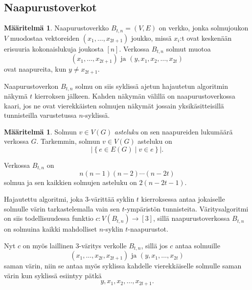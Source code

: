 \documentclass[finnish]{tktltiki2}
\theoremstyle{definition}
\newtheorem{maar}[lau]{Määritelmä}
\theoremstyle{remark}
\newcommand{\set}[1]{\left\{ #1 \right\}}
\begin{document}

\subsection{Naapurustoverkot}

\newcommand{\Btn}{B_{t,n}}
\begin{maar}
    Naapurustoverkko $\Btn = (V,E)$ on verkko, jonka solmujoukon $V$ muodostaa
    vektoreiden $(x_1,\dots,x_{2t+1})$ joukko, missä $x_i$:t ovat keskenään
    erisuuria kokonaislukuja joukosta $[n]$.  Verkossa $B_{t,n}$ solmut muotoa
    \begin{equation*}
        (x_1, \dots, x_{2t+1}) \text{ ja } (y, x_1, x_2, \dots, x_{2t})
    \end{equation*}
    ovat naapureita, kun $y \neq x_{2t+1}$.
\end{maar}

Naapurustoverkon $\Btn$ solmu on siis syklissä ajetun hajautetun algoritmin
näkymä $t$ kierroksen jälkeen. Kahden näkymän välillä on naapurustoverkossa
kaari, jos ne ovat vierekkäisten solmujen näkymät jossain yksikäsitteisillä
tunnisteilla varustetussa $n$-syklissä.

\begin{maar}
    Solmun $v \in V(G)$ \emph{asteluku} on sen naapureiden lukumäärä verkossa
    $G$. Tarkemmin, solmun $v \in V(G)$ asteluku on
    \begin{equation*}
            |\set{e \in E(G) \mid v \in e}|.
    \end{equation*}
\end{maar}

Verkossa $B_{t,n}$ on
%
\begin{equation*}
    n(n-1)(n-2) \cdots (n-2t)
\end{equation*}
%
solmua ja sen kaikkien solmujen asteluku on $2(n-2t-1)$.



Hajautettu algoritmi, joka 3-värittää syklin $t$ kierroksessa antaa jokaiselle
solmulle värin tarkastelemalla vain sen $t$-ympäristön tunnisteita.
Vä\-ri\-tys\-al\-go\-rit\-mi on siis todellisuudessa funktio $c : V(\Btn) \to [3]$, sillä
naapurustoverkossa $\Btn$ on solmuina kaikki mahdolliset $n$-syklin
$t$-naapurustot.

Nyt $c$ on myös laillinen 3-väritys verkolle $B_{t,n}$, sillä jos $c$ antaa
solmuille
%
\begin{equation*}
    (x_1, \dots, x_{2t}, x_{2t+1}) \text{ ja } (y,x_1,\dots,x_{2t})
\end{equation*}
%
saman värin, niin se antaa myös syklissa kahdelle vierekkäiselle solmulle saman
värin kun syklissä esiintyy pätkä
%
\begin{equation*}
    y, x_1, x_2, \dots, x_{2t+1}.
\end{equation*}
\end{document}
